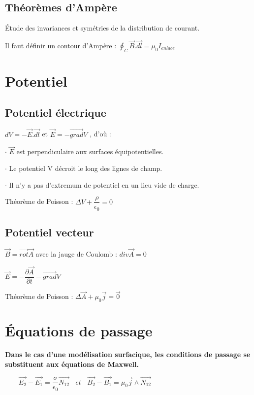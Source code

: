 \documentclass[9pt]{article}
\begin{document}
\begin{multicols*}{2}
\subsection{Théorèmes d'Ampère}

Étude des invariances et symétries de la distribution de courant.

Il faut définir un contour d'Ampère : $\boxed{\displaystyle{\oint_C \overrightarrow{B}.\overrightarrow{dl}} = \mu_{0}I_{enlace}}$


\section{Potentiel}
\subsection{Potentiel électrique}


$\boxed{dV = -\overrightarrow{E}.\overrightarrow{dl}}$ et $\boxed{\overrightarrow{E}=-\overrightarrow{grad}V}$ , d'où :

$\cdot$ $\overrightarrow{E}$ est perpendiculaire aux surfaces équipotentielles.

$\cdot$ Le potentiel V décroit le long des lignes de champ.

$\cdot$ Il n'y a pas d'extremum de potentiel en un lieu vide de charge.

Théorème de Poisson : $\boxed{\Delta V + \dfrac{\rho}{\epsilon_{0}}=0}$

\subsection{Potentiel vecteur}

$\overrightarrow{B}=\overrightarrow{rot}\overrightarrow{A}$ avec la jauge de Coulomb : $div\overrightarrow{A}=0$

$\overrightarrow{E}=-\dfrac{\partial\overrightarrow{A}}{\partial t}-\overrightarrow{grad}V$

Théorème de Poisson : $\Delta\overrightarrow{A}+\mu_{0}\overrightarrow{j}=\overrightarrow{0}$

\section{Équations de passage}

\textbf{Dans le cas d'une modélisation surfacique, les conditions de passage se substituent aux équations de Maxwell.} 

$\>\> \>\>\> \>\>\> \>\boxed{\overrightarrow{E_{2}}-\overrightarrow{E_{1}}=\dfrac{\sigma}{\epsilon_{0}}\overrightarrow{N_{12}} \> \> \> \> et \> \>\> \> \overrightarrow{B_{2}}-\overrightarrow{B_{1}}=\mu_{0}\overrightarrow{j}\wedge\overrightarrow{N_{12}} }$




\end{multicols*}
\end{document}
